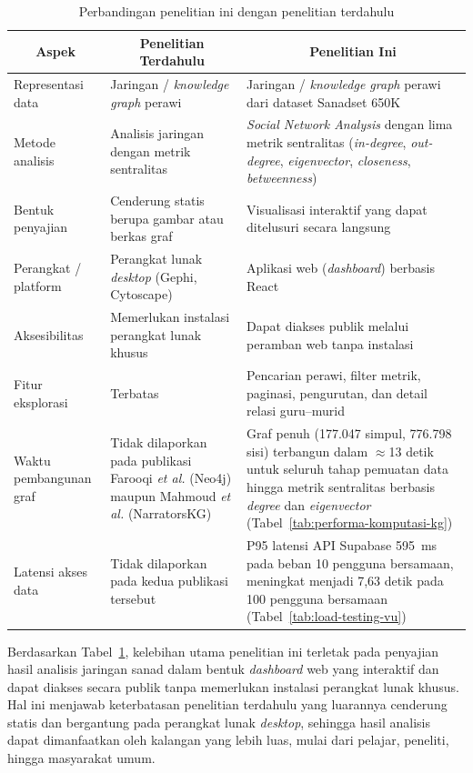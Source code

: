 \begin{table}[H]
\centering
\caption{Perbandingan penelitian ini dengan penelitian terdahulu}
\label{tab:perbandingan}
\renewcommand{\arraystretch}{1.3}
\small
\begin{tabular}{|p{2.8cm}|p{5.2cm}|p{5.2cm}|}
\hline
\multicolumn{1}{|c|}{\textbf{Aspek}} & \multicolumn{1}{c|}{\textbf{Penelitian Terdahulu}} & \multicolumn{1}{c|}{\textbf{Penelitian Ini}} \\
\hline
Representasi data & Jaringan / \textit{knowledge graph} perawi & Jaringan / \textit{knowledge graph} perawi dari dataset Sanadset 650K \\
\hline
Metode analisis & Analisis jaringan dengan metrik sentralitas & \textit{Social Network Analysis} dengan lima metrik sentralitas (\textit{in-degree}, \textit{out-degree}, \textit{eigenvector}, \textit{closeness}, \textit{betweenness}) \\
\hline
Bentuk penyajian & Cenderung statis berupa gambar atau berkas graf & Visualisasi interaktif yang dapat ditelusuri secara langsung \\
\hline
Perangkat / platform & Perangkat lunak \textit{desktop} (Gephi, Cytoscape) & Aplikasi web (\textit{dashboard}) berbasis React \\
\hline
Aksesibilitas & Memerlukan instalasi perangkat lunak khusus & Dapat diakses publik melalui peramban web tanpa instalasi \\
\hline
Fitur eksplorasi & Terbatas & Pencarian perawi, filter metrik, paginasi, pengurutan, dan detail relasi guru--murid \\
\hline
Waktu pembangunan graf & Tidak dilaporkan pada publikasi Farooqi \textit{et al.} \cite{FAROOQI2024110439} (Neo4j) maupun Mahmoud \textit{et al.} \cite{Mahmoud2024} (NarratorsKG) & Graf penuh (177.047 simpul, 776.798 sisi) terbangun dalam $\approx$13 detik untuk seluruh tahap pemuatan data hingga metrik sentralitas berbasis \textit{degree} dan \textit{eigenvector} (Tabel~\ref{tab:performa-komputasi-kg}) \\
\hline
Latensi akses data & Tidak dilaporkan pada kedua publikasi tersebut & P95 latensi API Supabase 595~ms pada beban 10 pengguna bersamaan, meningkat menjadi 7,63 detik pada 100 pengguna bersamaan (Tabel~\ref{tab:load-testing-vu}) \\
\hline
\end{tabular}
\end{table}

Berdasarkan Tabel~\ref{tab:perbandingan}, kelebihan utama penelitian ini terletak pada penyajian hasil analisis jaringan sanad dalam bentuk \textit{dashboard} web yang interaktif dan dapat diakses secara publik tanpa memerlukan instalasi perangkat lunak khusus. Hal ini menjawab keterbatasan penelitian terdahulu yang luarannya cenderung statis dan bergantung pada perangkat lunak \textit{desktop}, sehingga hasil analisis dapat dimanfaatkan oleh kalangan yang lebih luas, mulai dari pelajar, peneliti, hingga masyarakat umum.

